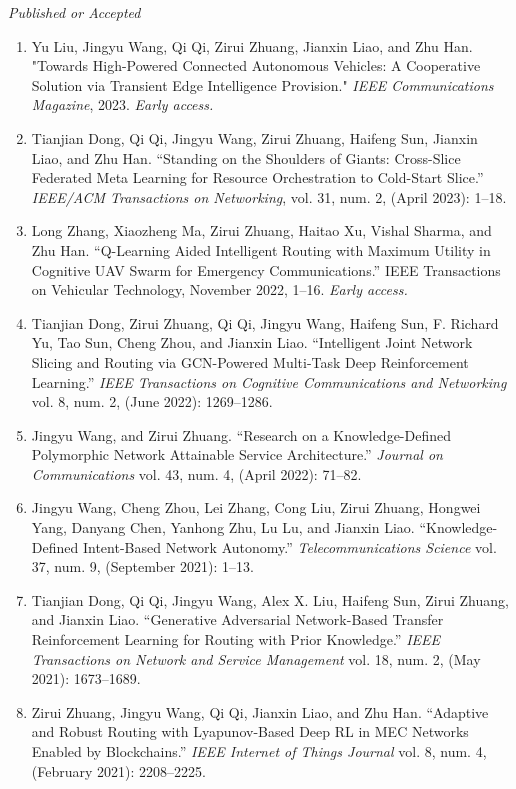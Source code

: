 \documentclass[letterpaper,11pt]{article}
\newcommand{\contentlength}{5.5in}
\begin{document}
\begin{tcolorbox}[flush right,breakable,colback=white,colframe=white,width=\contentlength]
		\textit{Published or Accepted}
		\begin{enumerate}[itemsep=0mm]
			\item Yu Liu, Jingyu Wang, Qi Qi, Zirui Zhuang, Jianxin Liao, and Zhu Han. "Towards High-Powered Connected Autonomous Vehicles: A Cooperative Solution via Transient Edge Intelligence Provision." \textit{IEEE Communications Magazine}, 2023. \textit{Early access.}
			\item Tianjian Dong, Qi Qi, Jingyu Wang, Zirui Zhuang, Haifeng Sun, Jianxin Liao, and Zhu Han. “Standing on the Shoulders of Giants: Cross-Slice Federated Meta Learning for Resource Orchestration to Cold-Start Slice.” \textit{IEEE/ACM Transactions on Networking}, vol. 31, num. 2, (April 2023): 1–18. 			
			\item Long Zhang, Xiaozheng Ma, Zirui Zhuang, Haitao Xu, Vishal Sharma, and Zhu Han. “Q-Learning Aided Intelligent Routing with Maximum Utility in Cognitive UAV Swarm for Emergency Communications.” IEEE Transactions on Vehicular Technology, November 2022, 1–16. \textit{Early access.}			
			\item Tianjian Dong, Zirui Zhuang, Qi Qi, Jingyu Wang, Haifeng Sun, F. Richard Yu, Tao Sun, Cheng Zhou, and Jianxin Liao. “Intelligent Joint Network Slicing and Routing via GCN-Powered Multi-Task Deep Reinforcement Learning.” \textit{IEEE Transactions on Cognitive Communications and Networking} vol. 8, num. 2, (June 2022): 1269–1286.
			\item Jingyu Wang, and Zirui Zhuang. “Research on a Knowledge-Defined Polymorphic Network Attainable Service Architecture.” \textit{Journal on Communications} vol. 43, num. 4, (April 2022): 71–82.
			\item Jingyu Wang, Cheng Zhou, Lei Zhang, Cong Liu, Zirui Zhuang, Hongwei Yang, Danyang Chen, Yanhong Zhu, Lu Lu, and Jianxin Liao. “Knowledge-Defined Intent-Based Network Autonomy.” \textit{Telecommunications Science} vol. 37, num. 9, (September 2021): 1–13.
			\item Tianjian Dong, Qi Qi, Jingyu Wang, Alex X. Liu, Haifeng Sun, Zirui Zhuang, and Jianxin Liao. “Generative Adversarial Network-Based Transfer Reinforcement Learning for Routing with Prior Knowledge.” \textit{IEEE Transactions on Network and Service Management} vol. 18, num. 2, (May 2021): 1673–1689.
			\item Zirui Zhuang, Jingyu Wang, Qi Qi, Jianxin Liao, and Zhu Han. “Adaptive and Robust Routing with Lyapunov-Based Deep RL in MEC Networks Enabled by Blockchains.” \textit{IEEE Internet of Things Journal} vol. 8, num. 4, (February 2021): 2208–2225.

\end{enumerate}
\end{tcolorbox}
\end{document}
